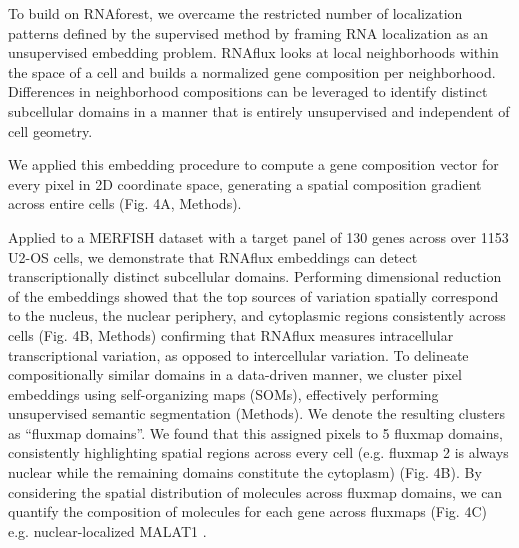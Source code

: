 To build on RNAforest, we overcame the restricted number of localization patterns defined by the supervised method by framing RNA localization as an unsupervised embedding problem. RNAflux looks at local neighborhoods within the space of a cell and builds a normalized gene composition per neighborhood. Differences in neighborhood compositions can be leveraged to identify distinct subcellular domains in a manner that is entirely unsupervised and independent of cell geometry.

We applied this embedding procedure to compute a gene composition vector for every pixel in 2D coordinate space, generating a spatial composition gradient across entire cells (Fig. 4A, Methods). 

Applied to a MERFISH dataset with a target panel of 130 genes across over 1153 U2-OS cells, we demonstrate that RNAflux embeddings can detect transcriptionally distinct subcellular domains. Performing dimensional reduction of the embeddings showed that the top sources of variation spatially correspond to the nucleus, the nuclear periphery, and cytoplasmic regions consistently across cells (Fig. 4B, Methods) confirming that RNAflux measures intracellular transcriptional variation, as opposed to intercellular variation. To delineate compositionally similar domains in a data-driven manner, we cluster pixel embeddings using self-organizing maps (SOMs), effectively performing unsupervised semantic segmentation (Methods). We denote the resulting clusters as “fluxmap domains”. We found that this assigned pixels to 5 fluxmap domains, consistently highlighting spatial regions across every cell (e.g. fluxmap 2 is always nuclear while the remaining domains constitute the cytoplasm) (Fig. 4B). By considering the spatial distribution of molecules across fluxmap domains, we can quantify the composition of molecules for each gene across fluxmaps (Fig. 4C) e.g. nuclear-localized MALAT1 \cite{moffittHighthroughputSinglecellGeneexpression2016,kumarIntracellularSpatialTranscriptomic2023}.


